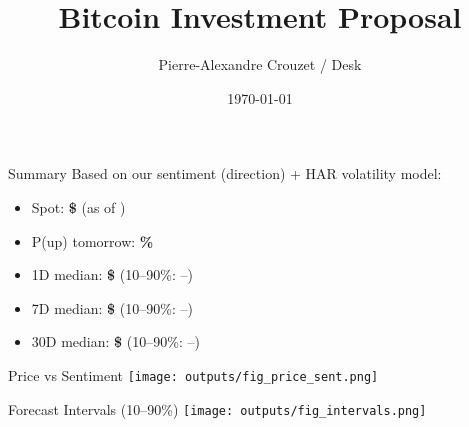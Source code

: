 \documentclass[11pt]{beamer}
\title{Bitcoin Investment Proposal}
\author{Pierre-Alexandre Crouzet / Desk}
\date{\today}
\begin{document}

\begin{frame}
  \titlepage
\end{frame}

\begin{frame}{Summary}
  Based on our sentiment (direction) + HAR volatility model:
  \begin{itemize}
    \item Spot: \textbf{\$ \spotUSD} \hfill (as of \reportDate)
    \item P(up) tomorrow: \textbf{\probUpOneDay\%}
    \item 1D median: \textbf{\$ \pOneMed} (10--90\%: --)
    \item 7D median: \textbf{\$ \pSevenMed} (10--90\%: --)
    \item 30D median: \textbf{\$ \pThirtyMed} (10--90\%: --)
  \end{itemize}
\end{frame}

\begin{frame}{Price vs Sentiment}
  \centering
  \texttt{[image: outputs/fig\_price\_sent.png]}
\end{frame}

\begin{frame}{Forecast Intervals (10--90\%)}
  \centering
  \texttt{[image: outputs/fig\_intervals.png]}
\end{frame}
\end{document}
